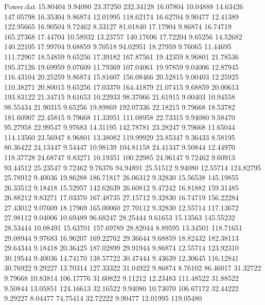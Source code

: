 \begin{filecontents}{Power.dat}
  15.80404    9.94080   23.37250  232.34128
  16.07804   10.04888   14.63426  147.05798
  16.35304    9.86874   12.01995  118.62174
  16.62704    9.90477   12.41389  122.95665
  16.90504    9.72462    8.33127   81.01840
  17.17904    9.86874   16.74719  165.27368
  17.44704   10.58932   13.23757  140.17696
  17.72204    9.65256   14.52682  140.22105
  17.99704    9.68859    9.70518   94.02951
  18.27959    9.76065   11.44695  111.72967
  18.54859    9.65256   17.39182  167.87561
  19.42359    8.96801   21.78536  195.37126
  19.69959    9.07609   11.79369  107.04061
  19.97859    9.04006   12.87945  116.43104
  20.25259    9.86874   15.81607  156.08466
  20.52815    9.00403   12.25925  110.38271
  20.80015    9.65256   17.03370  164.41879
  21.07415    9.68859   20.00613  193.83122
  21.34715    9.61653   10.22933   98.37066
  21.61915    9.00403   10.94558   98.55434
  21.90315    9.65256   19.89869  192.07336
  22.18215    9.79668   18.53782  181.60907
  22.45815    9.79668   11.33951  111.08958
  22.73315    9.94080    9.58470   95.27958
  22.99547    9.97683   14.31195  142.78781
  23.28247    9.79668   11.65044  114.13560
  23.56947    8.96801   13.38082  119.99929
  23.85347    9.36433    8.58195   80.36422
  24.13447    9.54447   10.98139  104.81158
  24.41347    9.50844   12.44970  118.37728
  24.68747    9.83271   10.19351  100.22985
  24.96147    9.72462    9.60913   93.44512
  25.23547    9.72462    9.76376   94.94891
  25.51512    9.94080   12.55714  124.82795
  25.78912    9.40036   19.86288  186.71817
  26.06312    9.32830   15.56538  145.19855
  26.33512    9.18418   15.52957  142.62639
  26.60812    9.47242   16.81882  159.31485
  26.88212    9.83271   17.03370  167.48735
  27.15712    9.32830   16.74719  156.22284
  27.43012    9.07609   18.17969  165.00060
  27.70112    9.32830   12.55714  117.13672
  27.98112    9.04006   10.69489   96.68247
  28.25444    9.61653   15.13563  145.55232
  28.53444   10.08491   15.63701  157.69789
  28.82044    8.89595   13.34501  118.71651
  29.08944    9.97683   16.96207  169.22762
  29.36644    9.68859   18.82432  182.38113
  29.64344    9.18418   20.36425  187.02899
  29.91944    9.86874   12.55714  123.92310
  30.19544    9.40036   14.74170  138.57722
  30.47444    9.43639   12.30645  116.12841
  30.76922    9.29227   13.70314  127.33322
  31.04922    9.86874    8.76102   86.46017
  31.32722    9.79668   10.83814  106.17776
  31.60822    9.11212   12.23483  111.48522
  31.88522    9.50844   13.05851  124.16613
  32.16522    9.94080   10.73070  106.67172
  32.44222    9.29227    8.04477   74.75414
  32.72222    9.90477   12.01995  119.05480

\end{filecontents}
